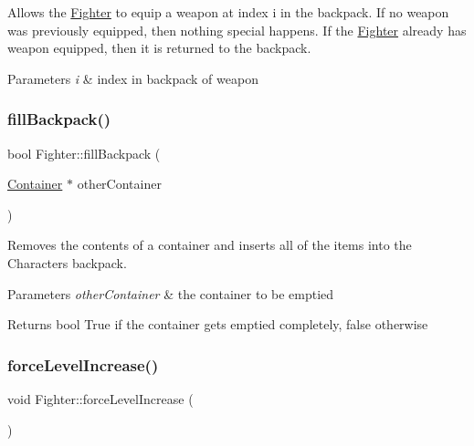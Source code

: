 Allows the \hyperlink{class_fighter}{Fighter} to equip a weapon at index \textquotesingle{}i\textquotesingle{} in the backpack. If no weapon was previously equipped, then nothing special happens. If the \hyperlink{class_fighter}{Fighter} already has weapon equipped, then it is returned to the backpack. 
\begin{DoxyParams}{Parameters}
{\em i} & index in backpack of weapon \\
\hline
\end{DoxyParams}
\hypertarget{class_fighter_a572fb61d329f4993701900ff3a1db5f8}{}\label{class_fighter_a572fb61d329f4993701900ff3a1db5f8} 
\subsubsection{\texorpdfstring{fill\+Backpack()}{fillBackpack()}}
{\footnotesize\ttfamily bool Fighter\+::fill\+Backpack (\begin{DoxyParamCaption}\item[{\hyperlink{class_container}{Container} $\ast$}]{other\+Container }\end{DoxyParamCaption})}

Removes the contents of a container and inserts all of the items into the Character\textquotesingle{}s backpack. 
\begin{DoxyParams}{Parameters}
{\em other\+Container} & the container to be emptied \\
\hline
\end{DoxyParams}
\begin{DoxyReturn}{Returns}
bool True if the container gets emptied completely, false otherwise 
\end{DoxyReturn}
\hypertarget{class_fighter_a774a40f8466eec10bee12b02e43e0aad}{}\label{class_fighter_a774a40f8466eec10bee12b02e43e0aad} 
\subsubsection{\texorpdfstring{force\+Level\+Increase()}{forceLevelIncrease()}}
{\footnotesize\ttfamily void Fighter\+::force\+Level\+Increase (\begin{DoxyParamCaption}{ }\end{DoxyParamCaption})\hspace{0.3cm}{\ttfamily [virtual]}}

